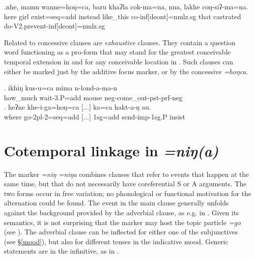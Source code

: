  \exg.nhe, mamu wanne=hoŋ=ca,                baru   khaʔla   cok-ma=na,                  nna, lakhe     coŋ-siʔ-ma=na.\\
 here girl exist{\sc [3;npst]=seq=add} instead like\_this co{\sc -inf[deont]=nmlz.sg} that castrated do{\sc -V2.prevent-inf[deont]=nmlz.sg}\\
  
 
 Related to concessive clauses are \emph{exhaustive} clauses. They contain a question word functioning as a pro-form that may stand for the greatest conceivable temporal extension in \Next[a] and for any conceivable location in \Next[b]. Such clauses can either be marked just by the additive focus marker, or by the concessive \emph{=hoŋca}.
 
 \exg. ikhiŋ   kus-u=ca                        mima  n-lond-a-ma-n\\
 how\_much wait{\sc -3.P=add} mouse {\sc neg-}come\_out{\sc -pst-prf-neg}\\
  
\bg. heʔne khe-i-ga=hoŋ=ca      [...]         ka=ca         hakt-a-ŋ          au. \\
where go{\sc -2pl-2=seq=add} [...] {\sc 1sg=add} send{\sc -imp-1sg.P} {\sc insist}\\
 


\section{Cotemporal linkage in \emph{=niŋ(a)}}\label{sim-finite}

The marker  \emph{=niŋ \ti =niŋa} combines clauses that refer to  events that happen at the same time, but that do not necessarily have coreferential S or A arguments. The two forms occur in free variation; no phonological or functional motivation for the alternation could be found. The event in the main clause generally unfolds against the background provided by the adverbial clause, as e.g. in \Next. Given its semantics, it is not surprising that the marker may  host the  topic particle \emph{=go} (see \Next[b]). The adverbial clause can be inflected for either one of the subjunctives (see §\ref{mood}), but also for different  tenses in the indicative mood. Generic statements are in the infinitive, as in  \Next[a].

